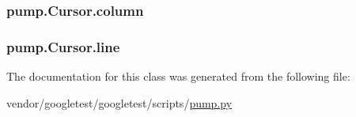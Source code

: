 \subsubsection[{\texorpdfstring{column}{column}}]{\setlength{\rightskip}{0pt plus 5cm}pump.\+Cursor.\+column}\hypertarget{classpump_1_1Cursor_ae73db76c3a845a82afb334633864254e}{}\label{classpump_1_1Cursor_ae73db76c3a845a82afb334633864254e}
\subsubsection[{\texorpdfstring{line}{line}}]{\setlength{\rightskip}{0pt plus 5cm}pump.\+Cursor.\+line}\hypertarget{classpump_1_1Cursor_aee8d8b67360da7fc4e635540cb41d48c}{}\label{classpump_1_1Cursor_aee8d8b67360da7fc4e635540cb41d48c}


The documentation for this class was generated from the following file\+:\begin{DoxyCompactItemize}
\item 
vendor/googletest/googletest/scripts/\hyperlink{pump_8py}{pump.\+py}\end{DoxyCompactItemize}
